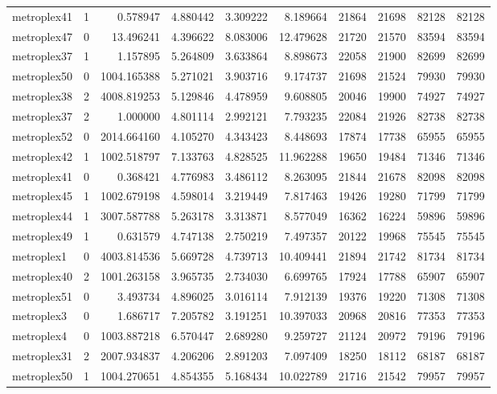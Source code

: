 \begin{longtable}{|l|r|r|r|r|r|r|r|r|r|}
metroplex41 & 1 & 0.578947 & 4.880442 & 3.309222 & 8.189664 & 21864 & 21698 & 82128 & 82128 \\
metroplex47 & 0 & 13.496241 & 4.396622 & 8.083006 & 12.479628 & 21720 & 21570 & 83594 & 83594 \\
metroplex37 & 1 & 1.157895 & 5.264809 & 3.633864 & 8.898673 & 22058 & 21900 & 82699 & 82699 \\
metroplex50 & 0 & 1004.165388 & 5.271021 & 3.903716 & 9.174737 & 21698 & 21524 & 79930 & 79930 \\
metroplex38 & 2 & 4008.819253 & 5.129846 & 4.478959 & 9.608805 & 20046 & 19900 & 74927 & 74927 \\
metroplex37 & 2 & 1.000000 & 4.801114 & 2.992121 & 7.793235 & 22084 & 21926 & 82738 & 82738 \\
metroplex52 & 0 & 2014.664160 & 4.105270 & 4.343423 & 8.448693 & 17874 & 17738 & 65955 & 65955 \\
metroplex42 & 1 & 1002.518797 & 7.133763 & 4.828525 & 11.962288 & 19650 & 19484 & 71346 & 71346 \\
metroplex41 & 0 & 0.368421 & 4.776983 & 3.486112 & 8.263095 & 21844 & 21678 & 82098 & 82098 \\
metroplex45 & 1 & 1002.679198 & 4.598014 & 3.219449 & 7.817463 & 19426 & 19280 & 71799 & 71799 \\
metroplex44 & 1 & 3007.587788 & 5.263178 & 3.313871 & 8.577049 & 16362 & 16224 & 59896 & 59896 \\
metroplex49 & 1 & 0.631579 & 4.747138 & 2.750219 & 7.497357 & 20122 & 19968 & 75545 & 75545 \\
metroplex1 & 0 & 4003.814536 & 5.669728 & 4.739713 & 10.409441 & 21894 & 21742 & 81734 & 81734 \\
metroplex40 & 2 & 1001.263158 & 3.965735 & 2.734030 & 6.699765 & 17924 & 17788 & 65907 & 65907 \\
metroplex51 & 0 & 3.493734 & 4.896025 & 3.016114 & 7.912139 & 19376 & 19220 & 71308 & 71308 \\
metroplex3 & 0 & 1.686717 & 7.205782 & 3.191251 & 10.397033 & 20968 & 20816 & 77353 & 77353 \\
metroplex4 & 0 & 1003.887218 & 6.570447 & 2.689280 & 9.259727 & 21124 & 20972 & 79196 & 79196 \\
metroplex31 & 2 & 2007.934837 & 4.206206 & 2.891203 & 7.097409 & 18250 & 18112 & 68187 & 68187 \\
metroplex50 & 1 & 1004.270651 & 4.854355 & 5.168434 & 10.022789 & 21716 & 21542 & 79957 & 79957 \\

\end{longtable}
